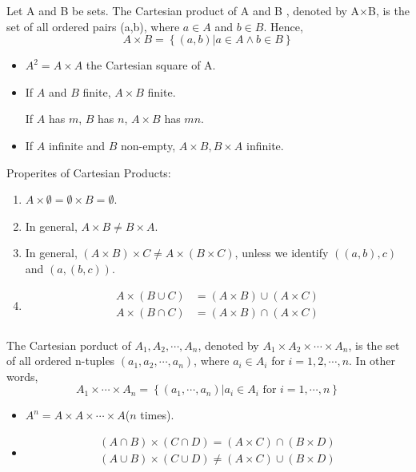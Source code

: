 \begin{definition}
    Let A and B be sets. \textcolor{light_red}{The Cartesian product of A and B} , denoted by A$\times$B, is the set of all ordered pairs (a,b), where $a\in A$ and $b\in B$. Hence,
    \[ A\times B = \left\{ (a,b) | a\in A \land b \in B  \right\} \]
\end{definition}

\begin{itemize}
    \item $A^2=A\times A$ the Cartesian square of A. 
    \item If $A$ and $B$ finite, $A \times B$ finite.
    
    If $A$ has $m$, $B$ has $n$, $A \times B$ has $mn$.
    \item If $A$ infinite and $B$ non-empty, $A\times B, B\times A$ infinite.
\end{itemize}

Properites of Cartesian Products: 
\begin{enumerate}
    \item $A \times \emptyset=\emptyset \times B =\emptyset$.
    \item In general, $A \times B\neq B\times A$.
    \item In general, $(A \times B)\times C \neq A \times (B\times C)$, unless we identify $((a,b),c)$ and $(a,(b,c))$. 
    \item \begin{align*}
        A \times (B \cup C) &= (A \times B )\cup (A \times C)\\
        A \times (B \cap C) &= (A \times B )\cap (A \times C)\\
    \end{align*}
\end{enumerate}

\begin{definition}
    \textcolor{light_red}{The Cartesian porduct of $A_1, A_2, \cdots, A_n$}, denoted by $A_1\times A_2\times \cdots \times A_n$, is the set of all ordered n-tuples $(a_1,a_2,\cdots, a_n)$, where $a_i \in A_i$ for $i=1,2,\cdots, n$. In other words, 
    \[ A_1\times \cdots \times A_n=\left\{ (a_1,\cdots, a_n)| a_i \in A_i \text{ for } i=1,\cdots, n \right\} \]
\end{definition}

\begin{itemize}
    \item $A^n=A\times A \times \cdots \times A$($n$ times).
    \item \begin{align*}
        (A \cap B )\times (C \cap D)=(A\times C)\cap (B\times D)\\
        (A \cup B )\times (C \cup D)\ne (A\times C)\cup (B\times D)\\
    \end{align*}
\end{itemize}

